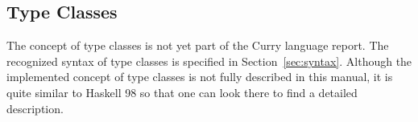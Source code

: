 \subsection{Type Classes}

The concept of type classes is not yet part of the Curry language report.
The recognized syntax of type classes is specified in
Section~\ref{sec:syntax}.
Although the implemented concept of type classes
is not fully described in this manual,
it is quite similar to Haskell 98 \cite{PeytonJones03Haskell}
so that one can look there to find a detailed description.


